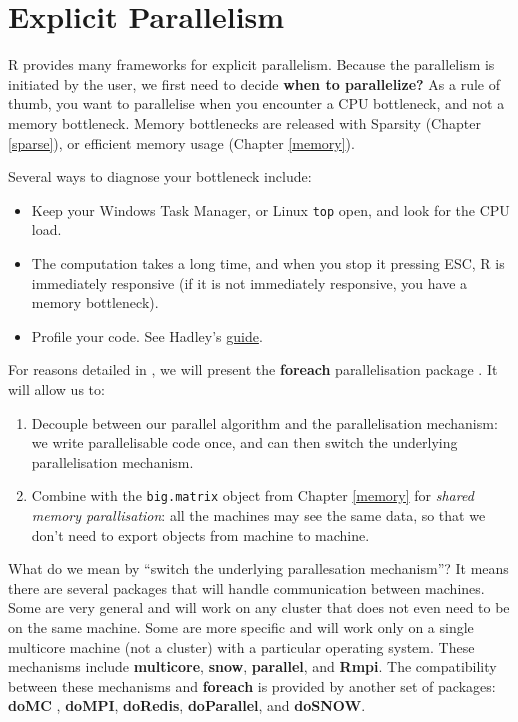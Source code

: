 \documentclass[]{book}
\providecommand{\tightlist}{%
  \setlength{\itemsep}{0pt}\setlength{\parskip}{0pt}}
\theoremstyle{definition}
\theoremstyle{definition}
\theoremstyle{remark}
\begin{document}
\section{Explicit Parallelism}\label{explicit-parallelism}

R provides many frameworks for explicit parallelism. Because the
parallelism is initiated by the user, we first need to decide
\textbf{when to parallelize?} As a rule of thumb, you want to
parallelise when you encounter a CPU bottleneck, and not a memory
bottleneck. Memory bottlenecks are released with Sparsity (Chapter
\ref{sparse}), or efficient memory usage (Chapter \ref{memory}).

Several ways to diagnose your bottleneck include:

\begin{itemize}
\tightlist
\item
  Keep your Windows Task Manager, or Linux \texttt{top} open, and look
  for the CPU load.
\item
  The computation takes a long time, and when you stop it pressing ESC,
  R is immediately responsive (if it is not immediately responsive, you
  have a memory bottleneck).
\item
  Profile your code. See Hadley's
  \href{http://adv-r.had.co.nz/Profiling.html}{guide}.
\end{itemize}

For reasons detailed in \citet{kane2013scalable}, we will present the
\textbf{foreach} parallelisation package \citep{foreach}. It will allow
us to:

\begin{enumerate}
\def\labelenumi{\arabic{enumi}.}
\item
  Decouple between our parallel algorithm and the parallelisation
  mechanism: we write parallelisable code once, and can then switch the
  underlying parallelisation mechanism.
\item
  Combine with the \texttt{big.matrix} object from Chapter \ref{memory}
  for \emph{shared memory parallisation}: all the machines may see the
  same data, so that we don't need to export objects from machine to
  machine.
\end{enumerate}

What do we mean by ``switch the underlying parallesation mechanism''? It
means there are several packages that will handle communication between
machines. Some are very general and will work on any cluster that does
not even need to be on the same machine. Some are more specific and will
work only on a single multicore machine (not a cluster) with a
particular operating system. These mechanisms include
\textbf{multicore}, \textbf{snow}, \textbf{parallel}, and \textbf{Rmpi}.
The compatibility between these mechanisms and \textbf{foreach} is
provided by another set of packages: \textbf{doMC} , \textbf{doMPI},
\textbf{doRedis}, \textbf{doParallel}, and \textbf{doSNOW}.
\end{document}
